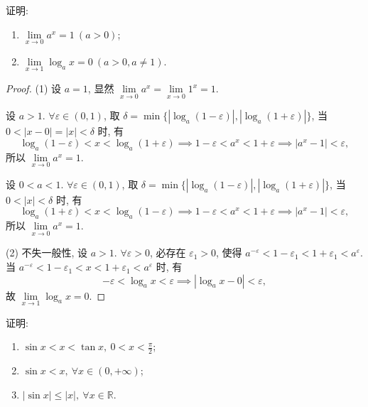 \begin{example}\label{ex:2.1.17}
证明:
\begin{enumerate}[label=(\arabic*)]
  \item $\lim\limits_{x\to 0}a^{x}=1\ (a>0)$;
  \item $\lim\limits_{x \to 1} \log_a x = 0\ (a > 0, a \neq 1)$.
\end{enumerate}
\end{example}

\begin{proof}
(1) 设 $a=1$, 显然 $\lim\limits_{x\to0}a^{x}=\lim\limits_{x\to0}1^{x}=1$.

设 $a>1$. $\forall\varepsilon\in(0,1)$, 取 $\delta=\min\{|\log_{a}(1-\varepsilon)|,|\log_{a}(1+\varepsilon)|\}$, 当 $0<|x-0|=|x|<\delta$ 时, 有
\[
\log_{a}(1-\varepsilon)<x<\log_{a}(1+\varepsilon)\implies 1-\varepsilon<a^{x}<1+\varepsilon\implies |a^{x}-1|<\varepsilon,
\]
所以 $\lim\limits_{x\to0} a^x = 1$.

设 $0 < a < 1$. $\forall \varepsilon \in (0,1)$, 取 $\delta = \min\{|\log_{a}(1-\varepsilon)|, |\log_{a}(1+\varepsilon)|\}$, 当 $0 < |x| < \delta$ 时, 有
\[
\log_{a}(1+\varepsilon)<x<\log_{a}(1-\varepsilon)\implies 1-\varepsilon<a^{x}<1+\varepsilon\implies |a^{x}-1|<\varepsilon,
\]
所以 $\lim\limits_{x\to0}a^{x}=1$.

(2) 不失一般性, 设 $a > 1$. $\forall \varepsilon > 0$, 必存在 $\varepsilon_{1} > 0$, 使得 $a^{-\varepsilon} < 1 - \varepsilon_{1} < 1 + \varepsilon_{1} < a^{\varepsilon}$. 当 $a^{-\varepsilon}<1-\varepsilon_{1}<x<1+\varepsilon_{1}<a^{\varepsilon}$ 时, 有
\[
-\varepsilon<\log_{a}x<\varepsilon\implies |\log_{a}x-0|<\varepsilon,
\]
故 $\lim\limits_{x\to1}\log_{a}x=0$.
\end{proof}

\begin{lemma}\label{lem:2.1.1}
证明:
\begin{enumerate}[label=(\arabic*)]
  \item $\sin x < x < \tan x,\ 0 < x < \frac{\pi}{2}$;
  \item $\sin x < x,\ \forall x \in (0, +\infty)$;
  \item $|\sin x|\leqslant|x|,\ \forall x\in\mathbb{R}$.
\end{enumerate}
\end{lemma}

